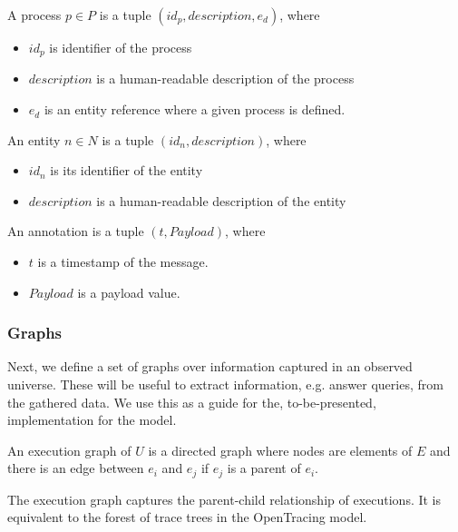 \begin{definition}[Process]
A process $p \in P$ is a tuple $(id_{p}, \textit{description}, e_{d})$, where
\begin{itemize}
	\item $id_{p}$ is identifier of the process
	\item $description$ is a human-readable description of the process
	\item $e_{d}$ is an entity reference where a given process is defined.
\end{itemize}
\end{definition}

\begin{definition}[Entity]
An entity $n \in N$ is a tuple $(id_n, description)$, where
\begin{itemize}
	\item $id_n$ is its identifier of the entity
	\item $description$ is a human-readable description of the entity
\end{itemize}
\end{definition}

\begin{definition}[Annotation]
An annotation is a tuple $(t, Payload)$, where
\begin{itemize}
	\item $t$ is a timestamp of the message.
	\item $Payload$ is a payload value.
\end{itemize}
\end{definition}

\subsubsection{Graphs}\label{sec:global-graphs}

Next, we define a set of graphs over information captured in an observed universe. These will be useful to extract information, e.g. answer queries, from the gathered data. We use this as a guide for the, to-be-presented, implementation for the model.

\begin{definition}
An execution graph of $U$ is a directed graph where nodes are elements of $E$ and there is an edge between $e_i$ and $e_j$ if $e_j$ is a parent of $e_i$.
\end{definition}

The execution graph captures the parent-child relationship of executions. It is equivalent to the forest of trace trees in the OpenTracing model.

